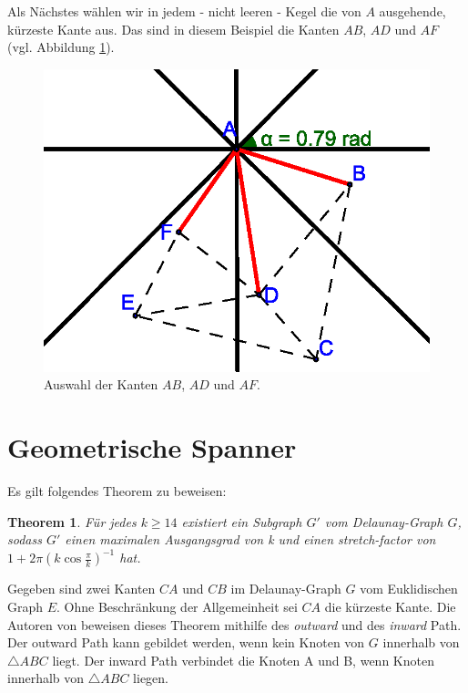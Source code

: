 \documentclass[a4paper,twoside]{IEEEtran}
\newtheorem{boundedSpannerTheorem}{Theorem}[section]
\begin{document}
Als Nächstes wählen wir in jedem - nicht leeren - Kegel die von $A $ ausgehende, kürzeste Kante aus.
Das sind in diesem Beispiel die Kanten $AB $, $AD $ und $AF $ (vgl. Abbildung \ref{fig:shortestedge}).

\begin{figure}[h!]
\centering
\includegraphics[width=1\linewidth]{shortest_edge.eps}
\caption{Auswahl der Kanten $AB $, $AD $ und $AF $.}
\label{fig:shortestedge}
\end{figure}





\section{Geometrische Spanner}

Es gilt folgendes Theorem zu beweisen:

\begin{boundedSpannerTheorem}
Für jedes $k \geq 14 $ existiert ein Subgraph $G' $ vom Delaunay-Graph $G $, sodass $G' $ einen maximalen Ausgangsgrad von k und einen stretch-factor von $1+2\pi(k \cos{\frac{\pi}{k}})^{-1} $ hat.
\end{boundedSpannerTheorem}
Gegeben sind zwei Kanten $CA $ und $CB $ im Delaunay-Graph $G $ vom Euklidischen Graph $E $.
Ohne Beschränkung der Allgemeinheit sei $CA $ die kürzeste Kante.
Die Autoren von \cite{kanj} beweisen dieses Theorem mithilfe des \emph{outward} und des \emph{inward} Path. %
Der outward Path kann gebildet werden, wenn kein Knoten von $G $ innerhalb von $\triangle {ABC} $ liegt.
Der inward Path verbindet die Knoten A und B, wenn Knoten innerhalb von $\triangle {ABC} $ liegen.
\end{document}
